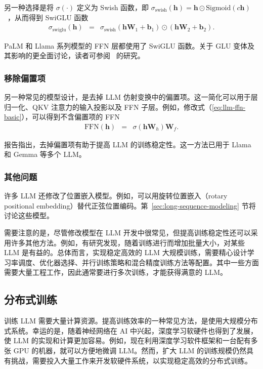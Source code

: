 另一种选择是将 $\sigma(\cdot)$ 定义为 Swish 函数，即 $\sigma_{\mathrm{swish}}(\mathbf{h}) = \mathbf{h} \odot \mathrm{Sigmoid}(c\mathbf{h})$~\cite{ramachandran-etal:2017searching}，从而得到 SwiGLU 函数
\begin{eqnarray}
\sigma_{\mathrm{swiglu}}(\mathbf{h}) & = & \sigma_{\mathrm{swish}}(\mathbf{h}\mathbf{W}_1 + \mathbf{b}_1) \odot (\mathbf{h}\mathbf{W}_2 + \mathbf{b}_2).
\end{eqnarray}

\noindent PaLM 和 Llama 系列模型的 FFN 层都使用了 SwiGLU 函数。关于 GLU 变体及其影响的更全面讨论，读者可参阅~\citet{shazeer-etal:2020glu} 的研究。

\subsubsection{移除偏置项}

\noindent 另一种常见的模型设计，是去掉 LLM 仿射变换中的偏置项。这一简化可以用于层归一化、QKV 注意力的输入投影以及 FFN 子层。例如，修改式（\ref{eq:llm-ffn-basic}），可以得到不含偏置项的 FFN
\begin{eqnarray}
\mathrm{FFN}(\mathbf{h}) & = & \sigma(\mathbf{h} \mathbf{W}_h) \mathbf{W}_f.
\end{eqnarray}

\citet{chowdhery-etal:2022palm} 报告指出，去掉偏置项有助于提高 LLM 的训练稳定性。这一方法已用于 Llama 和 Gemma 等多个 LLM。

\subsubsection{其他问题}

\noindent 许多 LLM 还修改了位置嵌入模型。例如，可以用旋转位置嵌入（rotary positional embedding）替代正弦位置编码。第~\ref{sec:long-sequence-modeling} 节将讨论这些模型。

需要注意的是，尽管修改模型在 LLM 开发中很常见，但提高训练稳定性还可以采用许多其他方法。例如，有研究发现，随着训练进行而增加批量大小，对某些 LLM 是有益的。总体而言，实现稳定高效的 LLM 大规模训练，需要精心设计学习率调度、优化器选择、并行训练策略和混合精度训练方法等配置。其中一些方面需要大量工程工作，因此通常要进行多次训练，才能获得满意的 LLM。

\subsection{分布式训练}
\label{sec:llm-distributed-training}

\noindent 训练 LLM 需要大量计算资源。提高训练效率的一种常见方法，是使用大规模分布式系统。幸运的是，随着神经网络在 AI 中兴起，深度学习软硬件也得到了发展，使 LLM 的实现和计算更加容易。例如，现在利用深度学习软件框架和一台配有多张 GPU 的机器，就可以方便地微调 LLM。然而，扩大 LLM 的训练规模仍然具有挑战，需要投入大量工作来开发软硬件系统，以实现稳定高效的分布式训练。


